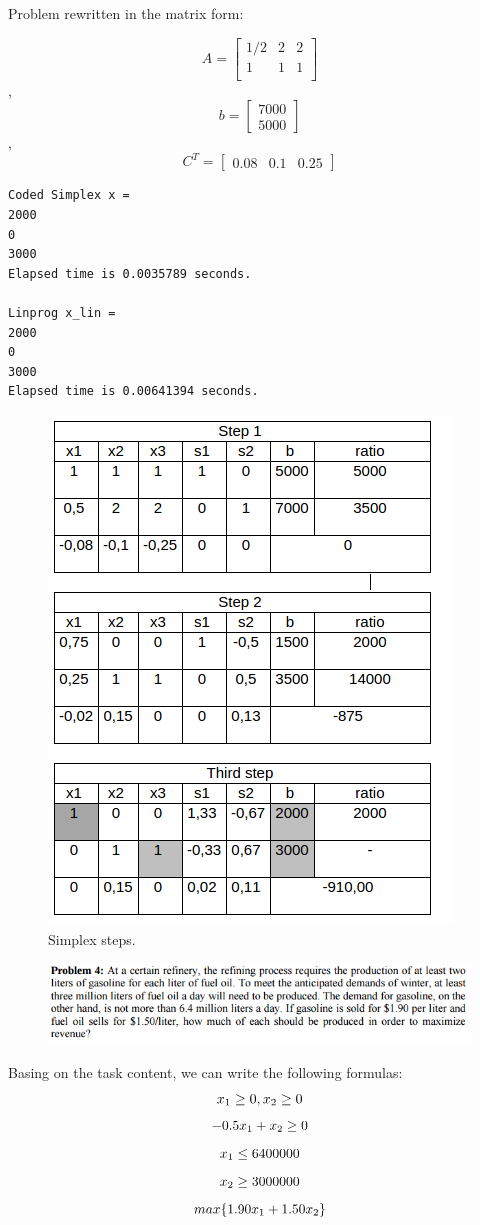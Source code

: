 \documentclass[eng,openany]{mgr}
\begin{document}
Problem rewritten in the matrix form:

\[
A =
\begin{bmatrix}
1/2 & 2 & 2 \\
1 & 1 & 1\\
\end{bmatrix}
\]
,
\[
b =
\begin{bmatrix}
7000 \\ 5000
\end{bmatrix}
\],
\[
C^T =
\begin{bmatrix}
0.08 & 0.1 & 0.25
\end{bmatrix}
\]

\begin{lstlisting}
Coded Simplex x =
2000
0
3000
Elapsed time is 0.0035789 seconds.

Linprog x_lin =
2000
0
3000
Elapsed time is 0.00641394 seconds.
\end{lstlisting}

\begin{figure}[h]
\centering
\includegraphics[width=0.3\linewidth]{screenshot009}
\caption{Simplex steps.}
\label{fig:screenshot009}
\end{figure}

\newpage
\begin{figure}[h]
\centering
\includegraphics[width=0.7\linewidth]{screenshot010}
\label{fig:screenshot010}
\end{figure}
Basing on the task content, we can write the following formulas:\\
\begin{equation*}
x_1 \geq 0, x_2\geq 0\\
\end{equation*}
\begin{equation*}
-0.5x_1 + x_2 \geq 0\\
\end{equation*}
\begin{equation*}
x_1  \leq 6 400 000\\
\end{equation*}
\begin{equation*}
x_2 \geq 3 000 000\\
\end{equation*}
\begin{equation*}
max\{1.90x_1+1.50x_2\}\\
\end{equation*}
\end{document}
